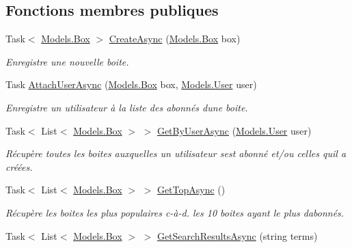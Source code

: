 \subsection*{Fonctions membres publiques}
\begin{DoxyCompactItemize}
\item 
Task$<$ \hyperlink{class_boxes_1_1_models_1_1_box}{Models.\+Box} $>$ \hyperlink{interface_boxes_1_1_services_1_1_box_1_1_i_box_service_adc238288afe6f877fa39cc6bd1acb01a}{Create\+Async} (\hyperlink{class_boxes_1_1_models_1_1_box}{Models.\+Box} box)
\begin{DoxyCompactList}\small\item\em Enregistre une nouvelle boite. \end{DoxyCompactList}\item 
Task \hyperlink{interface_boxes_1_1_services_1_1_box_1_1_i_box_service_a55e99b6b477c99d2d650d8525146a919}{Attach\+User\+Async} (\hyperlink{class_boxes_1_1_models_1_1_box}{Models.\+Box} box, \hyperlink{class_boxes_1_1_models_1_1_user}{Models.\+User} user)
\begin{DoxyCompactList}\small\item\em Enregistre un utilisateur à la liste des abonnés d\textquotesingle{}une boite. \end{DoxyCompactList}\item 
Task$<$ List$<$ \hyperlink{class_boxes_1_1_models_1_1_box}{Models.\+Box} $>$ $>$ \hyperlink{interface_boxes_1_1_services_1_1_box_1_1_i_box_service_aebd2c3458738bdd399110bfd1ef62cea}{Get\+By\+User\+Async} (\hyperlink{class_boxes_1_1_models_1_1_user}{Models.\+User} user)
\begin{DoxyCompactList}\small\item\em Récupère toutes les boites auxquelles un utilisateur s\textquotesingle{}est abonné et/ou celles qu\textquotesingle{}il a créées. \end{DoxyCompactList}\item 
Task$<$ List$<$ \hyperlink{class_boxes_1_1_models_1_1_box}{Models.\+Box} $>$ $>$ \hyperlink{interface_boxes_1_1_services_1_1_box_1_1_i_box_service_a32c793ab9911846581f0d76409b7fb60}{Get\+Top\+Async} ()
\begin{DoxyCompactList}\small\item\em Récupère les boites les plus populaires c-\/à-\/d. les 10 boites ayant le plus d\textquotesingle{}abonnés. \end{DoxyCompactList}\item 
Task$<$ List$<$ \hyperlink{class_boxes_1_1_models_1_1_box}{Models.\+Box} $>$ $>$ \hyperlink{interface_boxes_1_1_services_1_1_box_1_1_i_box_service_aae23fbf0a9889b22a09806f9410dc421}{Get\+Search\+Results\+Async} (string terms)

\end{DoxyCompactItemize}
